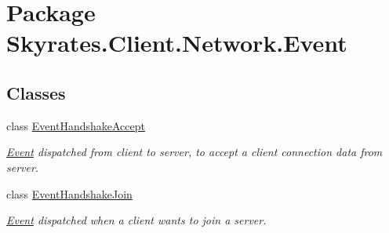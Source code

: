 \hypertarget{namespace_skyrates_1_1_client_1_1_network_1_1_event}{\section{Package Skyrates.\-Client.\-Network.\-Event}
\label{namespace_skyrates_1_1_client_1_1_network_1_1_event}
}
\subsection*{Classes}
\begin{DoxyCompactItemize}
\item 
class \hyperlink{class_skyrates_1_1_client_1_1_network_1_1_event_1_1_event_handshake_accept}{Event\-Handshake\-Accept}
\begin{DoxyCompactList}\small\item\em \hyperlink{namespace_skyrates_1_1_client_1_1_network_1_1_event}{Event} dispatched from client to server, to accept a client connection data from server. \end{DoxyCompactList}\item 
class \hyperlink{class_skyrates_1_1_client_1_1_network_1_1_event_1_1_event_handshake_join}{Event\-Handshake\-Join}
\begin{DoxyCompactList}\small\item\em \hyperlink{namespace_skyrates_1_1_client_1_1_network_1_1_event}{Event} dispatched when a client wants to join a server. \end{DoxyCompactList}\end{DoxyCompactItemize}
